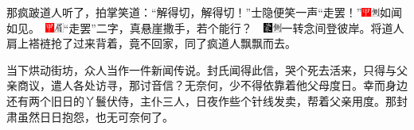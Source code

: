 那疯跛道人听了，拍掌笑道：``解得切，解得切！''士隐便笑一声``走罢！''{{\includegraphics[width=3mm]{../Images/00002}\includegraphics[width=3mm]{../Images/00011}\footnotesize \kaishu 如闻如见。　\includegraphics[width=3mm]{../Images/00002}\includegraphics[width=3mm]{../Images/00010}\footnotesize \kaishu ``走罢''二字，真悬崖撒手，若个能行？　}\includegraphics[width=3mm]{../Images/00006}\includegraphics[width=3mm]{../Images/00011}\footnotesize \kaishu 一转念间登彼岸。}将道人肩上褡裢抢了过来背着，竟不回家，同了疯道人飘飘而去。

当下烘动街坊，众人当作一件新闻传说。封氏闻得此信，哭个死去活来，只得与父亲商议，遣人各处访寻，那讨音信？无奈何，少不得依靠着他父母度日。幸而身边还有两个旧日的丫鬟伏侍，主仆三人，日夜作些个针线发卖，帮着父亲用度。那封肃虽然日日抱怨，也无可奈何了。

